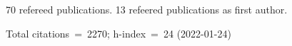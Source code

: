 70 refereed publications. 13 refeered publications as first author.

Total citations~=~2270; h-index~=~24 (2022-01-24)
